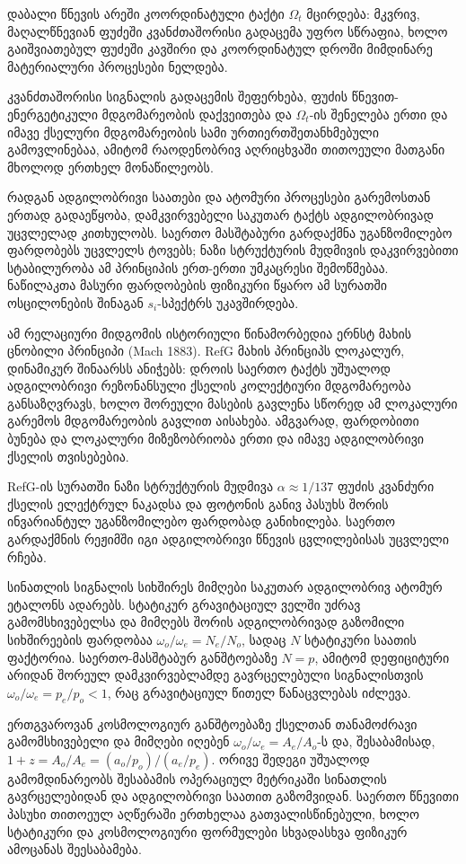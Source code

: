 \documentclass[11pt,a4paper]{article}
\begin{document}
დაბალი წნევის არეში კოორდინატული ტაქტი $\Omega_t$ მცირდება: მკვრივ, მაღალწნევიან ფუძეში კვანძთაშორისი გადაცემა უფრო სწრაფია, ხოლო გაიშვიათებულ ფუძეში კავშირი და კოორდინატულ დროში მიმდინარე მატერიალური პროცესები ნელდება.

კვანძთაშორისი სიგნალის გადაცემის შეფერხება, ფუძის წნევით-ენერგეტიკული მდგომარეობის დაქვეითება და $\Omega_t$-ის შენელება ერთი და იმავე ქსელური მდგომარეობის სამი ურთიერთშეთანხმებული გამოვლინებაა, ამიტომ რაოდენობრივ აღრიცხვაში თითოეული მათგანი მხოლოდ ერთხელ მონაწილეობს.

რადგან ადგილობრივი საათები და ატომური პროცესები გარემოსთან ერთად გადაეწყობა, დამკვირვებელი საკუთარ ტაქტს ადგილობრივად უცვლელად კითხულობს. საერთო მასშტაბური გარდაქმნა უგანზომილებო ფარდობებს უცვლელს ტოვებს; ნაზი სტრუქტურის მუდმივის დაკვირვებითი სტაბილურობა ამ პრინციპის ერთ-ერთი უმკაცრესი შემოწმებაა. ნაწილაკთა მასური ფარდობების ფიზიკური წყარო ამ სურათში ოსცილონების შინაგან $s_i$-სპექტრს უკავშირდება.

ამ რელაციური მიდგომის ისტორიული წინამორბედია ერნსტ მახის ცნობილი პრინციპი (Mach 1883). RefG მახის პრინციპს ლოკალურ, დინამიკურ შინაარსს ანიჭებს: დროის საერთო ტაქტს უშუალოდ ადგილობრივი რეზონანსული ქსელის კოლექტიური მდგომარეობა განსაზღვრავს, ხოლო შორეული მასების გავლენა სწორედ ამ ლოკალური გარემოს მდგომარეობის გავლით აისახება. ამგვარად, ფარდობითი ბუნება და ლოკალური მიზეზობრიობა ერთი და იმავე ადგილობრივი ქსელის თვისებებია.

RefG-ის სურათში ნაზი სტრუქტურის მუდმივა $\alpha \approx 1/137$ ფუძის კვანძური ქსელის ელექტრულ ნაკადსა და ფოტონის განივ პასუხს შორის ინვარიანტულ უგანზომილებო ფარდობად განიხილება. საერთო გარდაქმნის რეჟიმში იგი ადგილობრივი წნევის ცვლილებისას უცვლელი რჩება.

სინათლის სიგნალის სიხშირეს მიმღები საკუთარ ადგილობრივ ატომურ ეტალონს ადარებს. სტატიკურ გრავიტაციულ ველში უძრავ გამომსხივებელსა და მიმღებს შორის ადგილობრივად გაზომილი სიხშირეების ფარდობაა $\omega_o/\omega_e=N_e/N_o$, სადაც $N$ სტატიკური საათის ფაქტორია. საერთო-მასშტაბურ განშტოებაზე $N=p$, ამიტომ დეფიციტური არიდან შორეულ დამკვირვებლამდე გავრცელებული სიგნალისთვის $\omega_o/\omega_e=p_e/p_o<1$, რაც გრავიტაციულ წითელ წანაცვლებას იძლევა.

ერთგვაროვან კოსმოლოგიურ განშტოებაზე ქსელთან თანამოძრავი გამომსხივებელი და მიმღები იღებენ $\omega_o/\omega_e=A_e/A_o$-ს და, შესაბამისად, $1+z=A_o/A_e=(a_o/p_o)/(a_e/p_e)$. ორივე შედეგი უშუალოდ გამომდინარეობს შესაბამის ოპერაციულ მეტრიკაში სინათლის გავრცელებიდან და ადგილობრივი საათით გაზომვიდან. საერთო წნევითი პასუხი თითოეულ აღწერაში ერთხელაა გათვალისწინებული, ხოლო სტატიკური და კოსმოლოგიური ფორმულები სხვადასხვა ფიზიკურ ამოცანას შეესაბამება.
\end{document}
